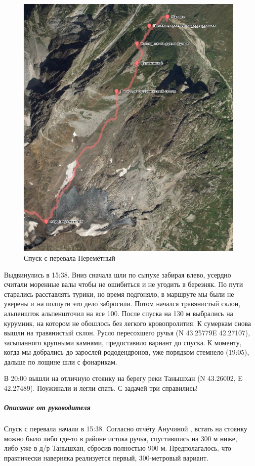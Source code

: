 \begin{figure}[h!]
	\centering
	\includegraphics[width=0.7\linewidth]{../pics/perem_down.png}
	\caption{Спуск с перевала Перемётный}
	\label{perem_down}
\end{figure} 
Выдвинулись в 15:38. Вниз сначала шли по сыпухе забирая влево, усердно считали моренные валы чтобы не ошибиться и не угодить в березняк. По пути старались расставлять турики, но время подгоняло, в маршруте мы были не  уверены и на полпути это дело забросили. Потом начался травянистый склон, альпеншток альпеншточил на все 100. После спуска на 130 м выбрались на курумник, на котором не обошлось без легкого кровопролития. К сумеркам снова вышли на травянистый склон. Русло пересохшего ручья (N 43.25779\degree E 42.27107\degree), засыпанного крупными камнями, предоставило вариант до спуска. К моменту, когда мы добрались до зарослей рододендронов, уже порядком стемнело (19:05), дальше по лощине шли с фонарикам. 

В 20:00 вышли на отличную стоянку на берегу реки Танышхан (N 43.26002, E 42.27489). Поужинали и легли спать. С задачей три справились! 

\subparagraph{Описание от руководителя} 

Спуск с перевала начали в 15:38. Согласно отчёту Анучиной \cite{Anuchina2019}, встать на стоянку можно было либо где-то в районе истока ручья, спустившись на 300 м ниже, либо уже в д/р Танышхан, сбросив полностью 900 м. Предполагалось, что практически наверняка реализуется первый, 300-метровый вариант. 

